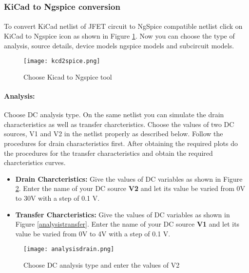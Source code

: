 \subsubsection{KiCad to Ngspice conversion}

\paragraph{} To convert KiCad netlist of JFET circuit to NgSpice
compatible netlist click on KiCad to Ngspice icon as shown in Figure \ref{kcd2spice7}.  Now you can choose the type of analysis, source details, device models ngspice models and subcircuit models.


\begin{figure}[h]
\centering
\texttt{[image: kcd2spice.png]}
\caption{Choose Kicad to Ngspice tool}
\label{kcd2spice7}
\end{figure}


\paragraph{Analysis:}Choose DC analysis type. On the same netlist you can simulate the drain characteristics as well as transfer charcteristics. Choose the values of two DC sources, V1 and V2 in the netlist properly as described below. Follow the procedures for drain characteristics first. After obtaining the required plots do the procedures for the transfer characteristics and obtain the required charcteristics curves.

\begin{itemize}
\item 
\textbf{Drain Charcteristics:} Give the values of DC variables as shown in Figure \ref{analysisdrain}. Enter the name of your DC source \textbf{V2} and let its value be varied from 0V to 30V with a step of 0.1 V.


\item
 \textbf{Transfer Charcteristics:} Give the values of DC variables as shown in Figure \ref{analysistransfer}. Enter the name of your DC source \textbf{V1} and let its value be varied from 0V to 4V with a step of 0.1 V.


\end{itemize}

\begin{figure}[h]
\centering
\texttt{[image: analysisdrain.png]}
\caption{Choose DC analysis type and enter the values of V2}
\label{analysisdrain}
\end{figure}


